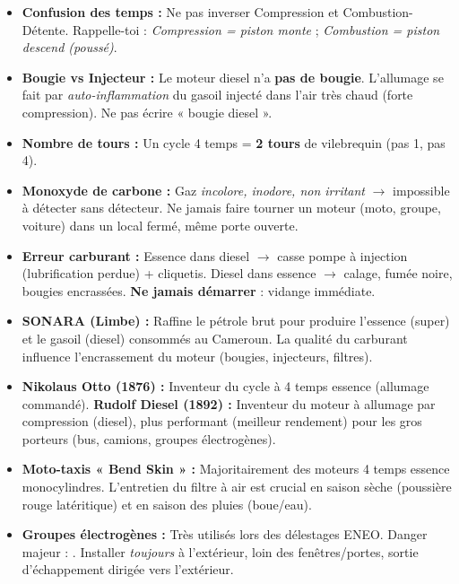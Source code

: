 \documentclass[11pt]{article}
\begin{document}
\begin{attention}
\begin{itemize}
\item \textbf{Confusion des temps :} Ne pas inverser Compression et Combustion-Détente. Rappelle-toi : \emph{Compression = piston monte} ; \emph{Combustion = piston descend (poussé)}.
\item \textbf{Bougie vs Injecteur :} Le moteur diesel n'a \textbf{pas de bougie}. L'allumage se fait par \emph{auto-inflammation} du gasoil injecté dans l'air très chaud (forte compression). Ne pas écrire « bougie diesel ».
\item \textbf{Nombre de tours :} Un cycle 4 temps = \textbf{2 tours} de vilebrequin (pas 1, pas 4).
\item \textbf{Monoxyde de carbone  :} Gaz \emph{incolore, inodore, non irritant} $\rightarrow$ impossible à détecter sans détecteur. Ne jamais faire tourner un moteur (moto, groupe, voiture) dans un local fermé, même porte ouverte.
\item \textbf{Erreur carburant :} Essence dans diesel $\rightarrow$ casse pompe à injection (lubrification perdue) + cliquetis. Diesel dans essence $\rightarrow$ calage, fumée noire, bougies encrassées. \textbf{Ne jamais démarrer} : vidange immédiate.
\end{itemize}
\end{attention}

\begin{savaistu}
\begin{itemize}
\item \textbf{SONARA (Limbe) :} Raffine le pétrole brut pour produire l'essence (super) et le gasoil (diesel) consommés au Cameroun. La qualité du carburant influence l'encrassement du moteur (bougies, injecteurs, filtres).
\item \textbf{Nikolaus Otto (1876) :} Inventeur du cycle à 4 temps essence (allumage commandé). \textbf{Rudolf Diesel (1892) :} Inventeur du moteur à allumage par compression (diesel), plus performant (meilleur rendement) pour les gros porteurs (bus, camions, groupes électrogènes).
\item \textbf{Moto-taxis « Bend Skin » :} Majoritairement des moteurs 4 temps essence monocylindres. L'entretien du filtre à air est crucial en saison sèche (poussière rouge latéritique) et en saison des pluies (boue/eau).
\item \textbf{Groupes électrogènes :} Très utilisés lors des délestages ENEO. Danger majeur : . Installer \emph{toujours} à l'extérieur, loin des fenêtres/portes, sortie d'échappement dirigée vers l'extérieur.
\end{itemize}
\end{savaistu}
\end{document}
